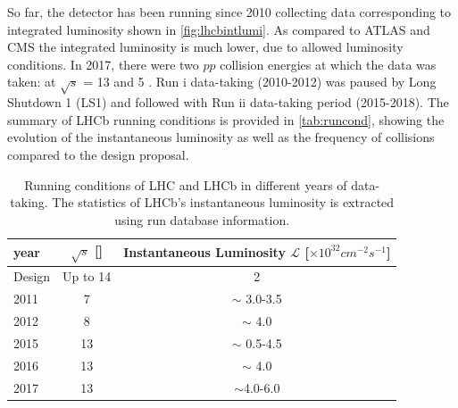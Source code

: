 So far, the detector has been running since 2010 collecting data corresponding to integrated luminosity shown in \autoref{fig:lhcbintlumi}. As compared to \Gls{ATLAS} and \Gls{CMS} the integrated luminosity is much lower, due to allowed luminosity conditions. In 2017, there were two $pp$ collision energies at which the data was taken: at $\sqrt{s}$  = 13 and 5 \tev. Run \Rn{1} data-taking (2010-2012) was paused by Long Shutdown 1 (\Gls{LS1}) and followed with Run \Rn{2} data-taking period (2015-2018). The summary of \gls{LHCb} running conditions is provided in \autoref{tab:runcond}, showing the evolution of the instantaneous luminosity as well as the frequency of collisions compared to the design proposal.




\begin{table}[!h]
	\centering
	\hspace*{-0.8cm}
	\begin{tabular}{l c c }
		\hline
		year & $\sqrt{s}$ [\tev] & Instantaneous Luminosity $\mathcal{L}$ [$\times10^{32} cm^{-2}	s^{-1}$] \\ \hline
		Design & Up to 14 & 2\\
		2011 & 7 & $\sim$ 3.0-3.5 \\
		2012 & 8 & $\sim$ 4.0 \\
		2015 & 13 & $\sim$ 0.5-4.5 \\      
		2016 & 13 & $\sim$ 4.0  \\      
		2017 & 13 & $\sim$4.0-6.0 \\\hline      
	\end{tabular}
	\caption{Running conditions of \gls{LHC} and \Gls{LHCb} in different years of data-taking. The statistics of \gls{LHCb}'s instantaneous luminosity is extracted using run database information.}
	\label{tab:runcond}
\end{table}   

